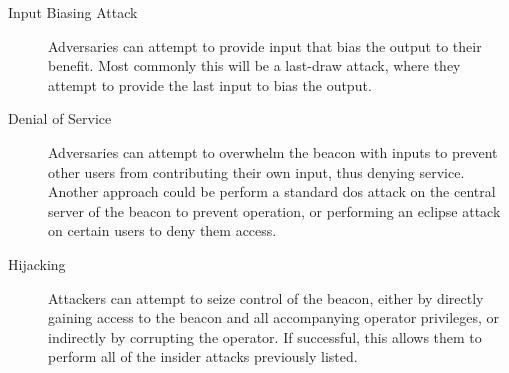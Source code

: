 \begin{description}
    \item [Input Biasing Attack] Adversaries can attempt to provide input that bias the output to their benefit. Most commonly this will be a last-draw attack, where they attempt to provide the last input to bias the output. 
    \item [Denial of Service] Adversaries can attempt to overwhelm the beacon with inputs to prevent other users from contributing their own input, thus denying service. Another approach could be perform a standard \gls{dos} attack on the central server of the beacon to prevent operation, or performing an eclipse attack on certain users to deny them access. 
    \item [Hijacking] Attackers can attempt to seize control of the beacon, either by directly gaining access to the beacon and all accompanying operator privileges, or indirectly by corrupting the operator. If successful, this allows them to perform all of the insider attacks previously listed.  
\end{description}



